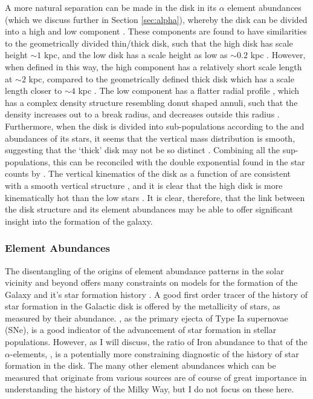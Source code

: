 A more natural separation can be made in the disk in its $\alpha$ element abundances (which we discuss further in Section \ref{sec:alpha}), whereby the disk can be divided into a high and low \afe{} component \citep[e.g.][]{1998A&A...338..161F,2003A&A...410..527B,2005A&A...433..185B,2013A&A...560A.109H,2014A&A...562A..71B,2014A&A...564A.115A,2014ApJ...796...38N,2015ApJ...808..132H}. These components are found to have similarities to the geometrically divided thin/thick disk, such that the high \afe{} disk has scale height $\sim 1$ kpc, and the low \afe{} disk has a scale height as low as $\sim 0.2$ kpc \citep[e.g.][]{2012ApJ...753..148B,2016ApJ...823...30B}. However, when defined in this way, the high \afe{} component has a relatively short scale length at $\sim 2$ kpc, compared to the geometrically defined thick disk which has a scale length closer to $\sim4$ kpc \citep{2008ApJ...673..864J}. The low \afe{} component has a flatter radial profile \citep{2012ApJ...752...51C}, which has a complex density structure resembling donut shaped annuli, such that the density increases out to a break radius, and decreases outside this radius \citep{2012ApJ...753..148B,2016ApJ...823...30B}. Furthermore, when the disk is divided into sub-populations according to the \afe{} and \feh{} abundances of its stars, it seems that the vertical mass distribution is smooth, suggesting that the `thick' disk may not be so distinct \citep{2012ApJ...751..131B}. Combining all the sup-populations, this can be reconciled with the double exponential found in the star counts by \citet{1983MNRAS.202.1025G} \citep[see][]{2013A&ARv..21...61R}. The vertical kinematics of the disk as a function of \afe{} are consistent with a smooth vertical structure \citep{2012ApJ...755..115B}, and it is clear that the high \afe{} disk is more kinematically hot than the low \afe{} stars \citep[e.g.][]{2005A&A...433..185B}. It is clear, therefore, that the link between the disk structure and its element abundances may be able to offer significant insight into the formation of the galaxy.

\subsubsection{Element Abundances}
\label{sec:diskabundances}
The disentangling of the origins of element abundance patterns in the solar vicinity and beyond offers many constraints on models for the formation of the Galaxy and it's star formation history \citep[a seminal review on the goals of this effort is given by][]{2002ARA&A..40..487F}. A good first order tracer of the history of star formation in the Galactic disk is offered by the metallicity of stars, as measured by their \feh{} abundance. \feh{}, as the primary ejecta of Type Ia supernovae (SNe), is a good indicator of the advancement of star formation in stellar populations. However, as I will discuss, the ratio of Iron abundance to that of the $\alpha$-elements, \afe{}, is a potentially more constraining diagnostic of the history of star formation in the disk. The many other element abundances which can be measured that originate from various sources are of course of great importance in understanding the history of the Milky Way, but I do not focus on these here.

